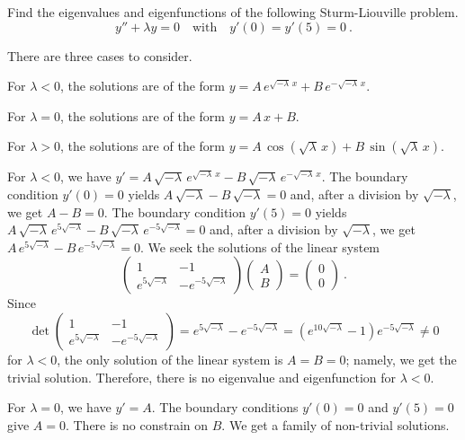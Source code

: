 \begin{egg}
Find the eigenvalues and eigenfunctions of the following
Sturm-Liouville problem.
\[
y''+ \lambda y = 0 \quad \text{with} \quad y'(0)= y'(5) = 0 \  .
\]

There are three cases to consider.

 For $\lambda < 0$, the solutions are of the form
$\displaystyle y = A\, e^{\sqrt{-\lambda}\,x}+
B\, e^{-\sqrt{-\lambda}\,x}$.

 For $\lambda = 0$, the solutions are of the form
$\displaystyle y = A\,x + B$.

 For $\lambda > 0$, the solutions are of the form
$\displaystyle y = A\, \cos\left(\sqrt{\lambda}\,x\right)+
B\, \sin\left(\sqrt{\lambda}\,x\right)$.

 For $\lambda < 0$, we have
$\displaystyle y' = A\,\sqrt{-\lambda}\, e^{\sqrt{-\lambda}\,x} -
B\, \sqrt{-\lambda}\, e^{-\sqrt{-\lambda}\,x}$.
The boundary condition $y'(0)=0$ yields
$A\,\sqrt{-\lambda} - B\, \sqrt{-\lambda} = 0$ and, after a division
by $\sqrt{-\lambda}$, we get $A-B=0$.  The boundary condition
$y'(5) = 0$ yields
$\displaystyle A\,\sqrt{-\lambda}\, e^{5\sqrt{-\lambda}} -
B\, \sqrt{-\lambda}\, e^{-5\sqrt{-\lambda}} =0$ and, after a division
by $\sqrt{-\lambda}$, we get
$\displaystyle A\, e^{5\sqrt{-\lambda}} - B\, e^{-5\sqrt{-\lambda}} =0$.
We seek the solutions of the linear system
\[
\begin{pmatrix}
1 & -1 \\
e^{5\sqrt{-\lambda}} & -e^{-5\sqrt{-\lambda}}
\end{pmatrix}
\begin{pmatrix} A\\ B \end{pmatrix}
= \begin{pmatrix} 0 \\ 0 \end{pmatrix} \ .
\]
Since
\[
\det 
\begin{pmatrix}
1 & -1 \\
e^{5\sqrt{-\lambda}} & -e^{-5\sqrt{-\lambda}}
\end{pmatrix}
= e^{5\sqrt{-\lambda}} - e^{-5\sqrt{-\lambda}} 
= \left(e^{10\sqrt{-\lambda}} -1\right) e^{-5\sqrt{-\lambda}}
\neq 0
\]
for $\lambda < 0$, the only solution of the linear system is
$A=B=0$; namely, we get the trivial solution.  Therefore, there is no eigenvalue
and eigenfunction for $\lambda <0$.

 For $\lambda = 0$, we have $\displaystyle y' = A$.
The boundary conditions $y'(0)=0$ and $y'(5) = 0$ give $A=0$.
There is no constrain on $B$.  We get a family of non-trivial
solutions.


\end{egg}

